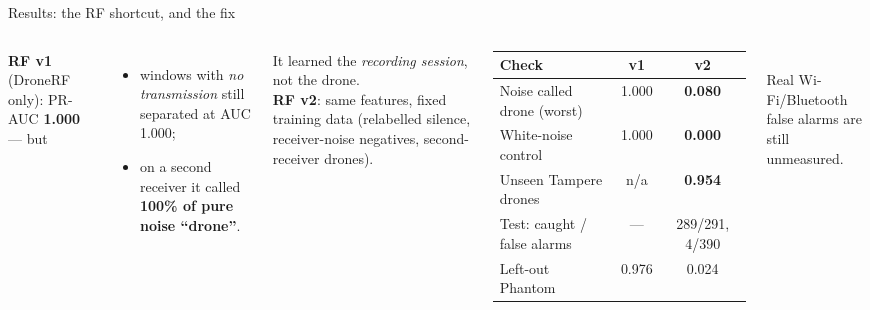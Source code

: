 \documentclass[aspectratio=169,11pt]{beamer}
\begin{document}
\begin{frame}{Results: the RF shortcut, and the fix}
\begin{columns}[T]
\textbf{RF v1} (DroneRF only): PR-AUC \textbf{1.000} --- but
\begin{itemize}\small
  \item windows with \emph{no transmission} still separated at AUC 1.000;
  \item on a second receiver it called \textbf{100\% of pure noise ``drone''}.
\end{itemize}
It learned the \emph{recording session}, not the drone.\\[4pt]
\textbf{RF v2}: same features, fixed training data (relabelled silence, receiver-noise negatives,
second-receiver drones).
\small
\begin{tabular}{@{}lcc@{}}
\toprule
Check & v1 & v2 \\
\midrule
Noise called drone (worst) & 1.000 & \textbf{0.080} \\
White-noise control & 1.000 & \textbf{0.000} \\
Unseen Tampere drones & n/a & \textbf{0.954} \\
Test: caught / false alarms & --- & 289/291, 4/390 \\
Left-out Phantom & 0.976 & 0.024 \\
\bottomrule
\end{tabular}\\[4pt]
\footnotesize Real Wi-Fi/Bluetooth false alarms are still unmeasured.
\end{columns}
\end{frame}
\end{document}

